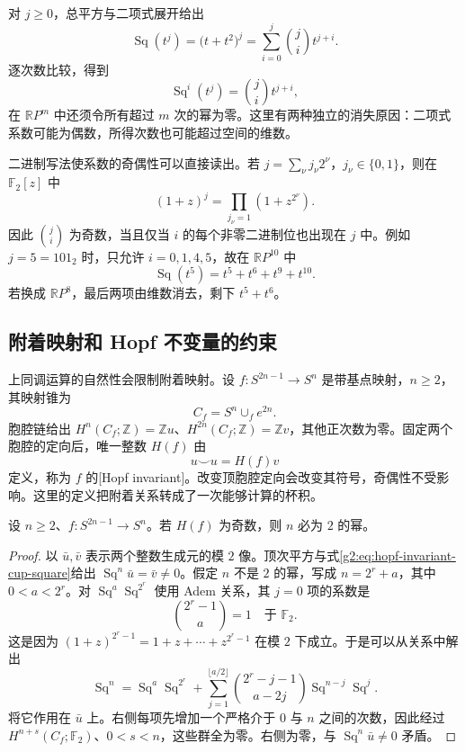 对 \(j\ge0\)，总平方与二项式展开给出
\[
	\operatorname{Sq}(t^j)=\bigl(t+t^2\bigr)^j
	=\sum_{i=0}^j\binom ji t^{j+i}.
\]
逐次数比较，得到
\begin{equation}\label{g2:eq:projective-steenrod-formula}
	\operatorname{Sq}^i(t^j)=\binom ji t^{j+i},
\end{equation}
在 \(\mathbb RP^m\) 中还须令所有超过 \(m\) 次的幂为零。这里有两种独立的消失原因：二项式系数可能为偶数，所得次数也可能超过空间的维数。

\ProseParagraphBreak

二进制写法使系数的奇偶性可以直接读出。若 \(j=\sum_\nu j_\nu2^\nu\)，\(j_\nu\in\{0,1\}\)，则在 \(\mathbb F_2[z]\) 中
\[
	(1+z)^j=\prod_{j_\nu=1}(1+z^{2^\nu}).
\]
因此 \(\binom ji\) 为奇数，当且仅当 \(i\) 的每个非零二进制位也出现在 \(j\) 中。例如 \(j=5=101_2\) 时，只允许 \(i=0,1,4,5\)，故在 \(\mathbb RP^{10}\) 中
\[
	\operatorname{Sq}(t^5)=t^5+t^6+t^9+t^{10}.
\]
若换成 \(\mathbb RP^8\)，最后两项由维数消去，剩下 \(t^5+t^6\)。

\subsection{附着映射和 Hopf 不变量的约束}
\label{g2:subsec:1303:05}

上同调运算的自然性会限制附着映射。设 \(f:S^{2n-1}\to S^n\) 是带基点映射，\(n\ge2\)，其映射锥为
\[
	C_f=S^n\cup_f e^{2n}.
\]
胞腔链给出 \(H^n(C_f;\mathbb Z)=\mathbb Zu\)、\(H^{2n}(C_f;\mathbb Z)=\mathbb Zv\)，其他正次数为零。固定两个胞腔的定向后，唯一整数 \(H(f)\) 由
\begin{equation}\label{g2:eq:hopf-invariant-cup-square}
	u\smile u=H(f)v
\end{equation}
定义，称为 \(f\) 的[Hopf invariant]。改变顶胞腔定向会改变其符号，奇偶性不受影响。这里的定义把附着关系转成了一次能够计算的杯积。

\begin{proposition}\label{g2:prop:hopf-invariant-power-two}
	设 \(n\ge2\)、\(f:S^{2n-1}\to S^n\)。若 \(H(f)\) 为奇数，则 \(n\) 必为 \(2\) 的幂。
\end{proposition}
\begin{proof}
	以 \(\bar u,\bar v\) 表示两个整数生成元的模 \(2\) 像。顶次平方与式\eqref{g2:eq:hopf-invariant-cup-square}给出 \(\operatorname{Sq}^n\bar u=\bar v\ne0\)。假定 \(n\) 不是 \(2\) 的幂，写成 \(n=2^r+a\)，其中 \(0<a<2^r\)。对 \(\operatorname{Sq}^a\operatorname{Sq}^{2^r}\) 使用 Adem 关系，其 \(j=0\) 项的系数是
	\[
		\binom{2^r-1}{a}=1\quad\text{于 }\mathbb F_2.
	\]
	这是因为 \((1+z)^{2^r-1}=1+z+\cdots+z^{2^r-1}\) 在模 \(2\) 下成立。于是可以从关系中解出
	\[
		\operatorname{Sq}^n
		=\operatorname{Sq}^a\operatorname{Sq}^{2^r}
		+\sum_{j=1}^{\lfloor a/2\rfloor}
		\binom{2^r-j-1}{a-2j}\operatorname{Sq}^{n-j}\operatorname{Sq}^j.
	\]
	将它作用在 \(\bar u\) 上。右侧每项先增加一个严格介于 \(0\) 与 \(n\) 之间的次数，因此经过 \(H^{n+s}(C_f;\mathbb F_2)\)、\(0<s<n\)，这些群全为零。右侧为零，与 \(\operatorname{Sq}^n\bar u\ne0\) 矛盾。
\end{proof}

